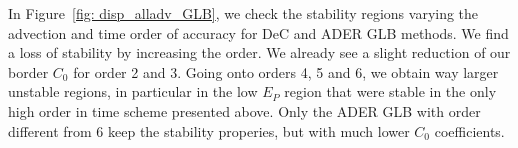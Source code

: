 


In Figure~\ref{fig: disp_alladv_GLB}, we check the stability regions varying the advection and time order of accuracy for DeC and ADER GLB methods. 
We find a loss of stability by increasing the order. We already see a slight reduction of our border $C_0$ for order 2 and 3. Going onto orders 4, 5 and 6, we obtain way larger unstable regions, in particular in the low $E_P$ region that were stable in the only high order in time scheme presented above. Only the ADER GLB with order different from 6 keep the stability properies, but with much lower $C_0$ coefficients.

